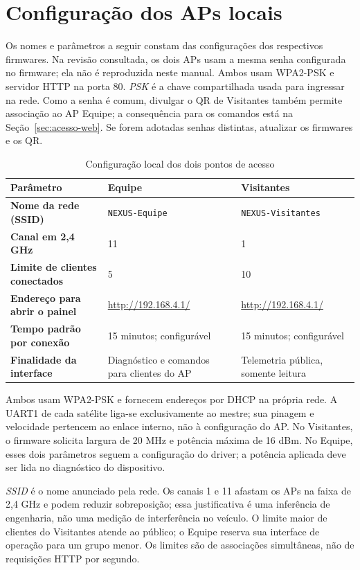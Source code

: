 \section{Configuração dos APs locais}\label{sec:aps-locais}
Os nomes e parâmetros a seguir constam das configurações dos respectivos firmwares. Na revisão consultada, os dois APs usam a mesma senha configurada no firmware; ela não é reproduzida neste manual. Ambos usam WPA2-PSK e servidor HTTP na porta 80. \emph{PSK} é a chave compartilhada usada para ingressar na rede. Como a senha é comum, divulgar o QR de Visitantes também permite associação ao AP Equipe; a consequência para os comandos está na Seção~\ref{sec:acesso-web}. Se forem adotadas senhas distintas, atualizar os firmwares e os QR.

\begin{table}[htbp]\centering\small
\caption{Configuração local dos dois pontos de acesso}\label{tab:aps-wifi}
\begin{tabularx}{\textwidth}{@{}>{\raggedright\arraybackslash\bfseries}p{3.2cm}X X@{}}
\toprule
Parâmetro & Equipe & Visitantes\\
\midrule
Nome da rede (SSID) & \texttt{NEXUS-Equipe} & \texttt{NEXUS-Visitantes}\\
Canal em 2,4 GHz & 11 & 1\\
Limite de clientes conectados & 5 & 10\\
Endereço para abrir o painel & \url{http://192.168.4.1/} & \url{http://192.168.4.1/}\\
Tempo padrão por conexão & 15 minutos; configurável & 15 minutos; configurável\\
Finalidade da interface & Diagnóstico e comandos para clientes do AP & Telemetria pública, somente leitura\\
\bottomrule
\end{tabularx}
\end{table}

Ambos usam WPA2-PSK e fornecem endereços por DHCP na própria rede. A UART1 de cada satélite liga-se exclusivamente ao mestre; sua pinagem e velocidade pertencem ao enlace interno, não à configuração do AP. No Visitantes, o firmware solicita largura de 20 MHz e potência máxima de 16 dBm. No Equipe, esses dois parâmetros seguem a configuração do driver; a potência aplicada deve ser lida no diagnóstico do dispositivo.

\emph{SSID} é o nome anunciado pela rede. Os canais 1 e 11 afastam os APs na faixa de 2,4 GHz e podem reduzir sobreposição; essa justificativa é uma inferência de engenharia, não uma medição de interferência no veículo. O limite maior de clientes do Visitantes atende ao público; o Equipe reserva sua interface de operação para um grupo menor. Os limites são de associações simultâneas, não de requisições HTTP por segundo.

